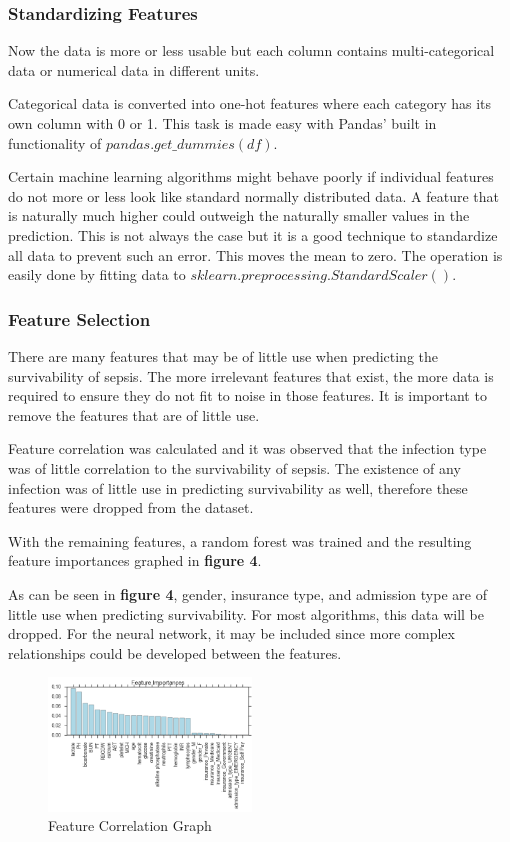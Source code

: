\documentclass[11pt]{article}
\begin{document}
		\subsubsection{Standardizing Features}
		Now the data is more or less usable but each column contains multi-categorical data or numerical data in different units.
		
		Categorical data is converted into one-hot features where each category has its own column with 0 or 1. This task is made easy with Pandas' built in functionality of \(pandas.get\_dummies(df)\).
		
		Certain machine learning algorithms might behave poorly if individual features do not more or less look like standard normally distributed data. A feature that is naturally much higher could outweigh the naturally smaller values in the prediction. This is not always the case but it is a good technique to standardize all data to prevent such an error. This moves the mean to zero. The operation is easily done by fitting data to \(sklearn.preprocessing.StandardScaler()\).
		
		\subsubsection{Feature Selection}
		There are many features that may be of little use when predicting the survivability of sepsis. The more irrelevant features that exist, the more data is required to ensure they do not fit to noise in those features. It is important to remove the features that are of little use. 
		
		Feature correlation was calculated and it was observed that the infection type was of little correlation to the survivability of sepsis. The existence of any infection was of little use in predicting survivability as well, therefore these features were dropped from the dataset.
		
		With the remaining features, a random forest was trained and the resulting feature importances graphed in \textbf{figure 4}.
		
		
		As can be seen in \textbf{figure 4}, gender, insurance type, and admission type are of little use when predicting survivability. For most algorithms, this data will be dropped. For the neural network, it may be included since more complex relationships could be developed between the features.
		
		\begin{figure}
			\begin{center}
				\includegraphics[width=0.48\textwidth]{feature_correlation_2.png}
			\end{center}
			\caption{Feature Correlation Graph}
		\end{figure}
	
\end{document}
